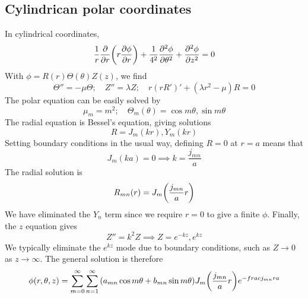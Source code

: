 \subsection{Cylindrican polar coordinates}
In cylindrical coordinates,
\[ \frac{1}{r} \pdv{r} \qty(r \pdv{\phi}{r}) + \frac{1}{4^2} \pdv[2]{\phi}{\theta} + \pdv[2]{\phi}{z} = 0 \]
With \( \phi = R(r) \Theta(\theta) Z(z) \), we find
\[ \Theta'' = -\mu \Theta;\quad Z'' = \lambda Z;\quad r(rR')' + (\lambda r^2 - \mu) R = 0 \]
The polar equation can be easily solved by
\[ \mu_m = m^2;\quad \Theta_m(\theta) = \cos m\theta, \sin m\theta \]
The radial equation is Bessel's equation, giving solutions
\[ R = J_m(kr), Y_m(kr) \]
Setting boundary conditions in the usual way, defining \( R=0 \) at \( r = a \) means that
\[ J_m(ka) = 0 \implies k = \frac{j_{mn}}{a} \]
The radial solution is
\[ R_{mn}(r) = J_m\qty(\frac{j_{mn}}{a}r) \]
We have eliminated the \( Y_n \) term since we require \( r = 0 \) to give a finite \( \phi \).
Finally, the \( z \) equation gives
\[ Z'' = k^2 Z \implies Z = e^{-kz}, e^{kz} \]
We typically eliminate the \( e^{kz} \) mode due to boundary conditions, such as \( Z \to 0 \) as \( z \to \infty \).
The general solution is therefore
\[ \phi(r,\theta,z) = \sum_{m=0}^\infty \sum_{n = 1}^\infty \qty(a_{mn} \cos m\theta + b_{mn} \sin m\theta) J_m\qty(\frac{j_{mn}}{a} r) e^{-frac{j_{mn}r}{a}} \]

